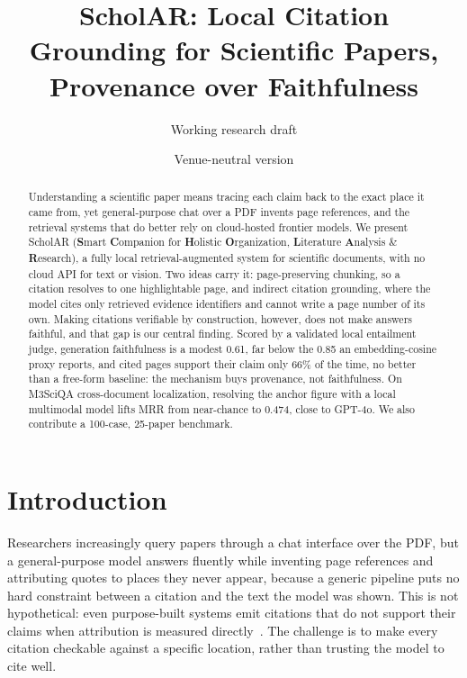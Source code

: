 \documentclass[11pt,letterpaper]{article}
\title{ScholAR: Local Citation Grounding for Scientific Papers,\\Provenance over Faithfulness}
\author{Working research draft}
\date{Venue-neutral version}
\begin{document}
\maketitle

\begin{abstract}
Understanding a scientific paper means tracing each claim back to the exact place it came from, yet
general-purpose chat over a PDF invents page references, and the retrieval systems that do better
rely on cloud-hosted frontier models. We present ScholAR (\textbf{S}mart \textbf{C}ompanion for
\textbf{H}olistic \textbf{O}rganization, \textbf{L}iterature \textbf{A}nalysis \& \textbf{R}esearch),
a fully local retrieval-augmented system for scientific documents, with no cloud API for text or
vision. Two ideas carry it: page-preserving chunking, so a citation resolves to one highlightable
page, and indirect citation grounding, where the model cites only retrieved evidence identifiers and
cannot write a page number of its own. Making citations verifiable by construction, however, does not
make answers faithful, and that gap is our central finding. Scored by a validated local entailment
judge, generation faithfulness is a modest 0.61, far below the 0.85 an embedding-cosine proxy
reports, and cited pages support their claim only 66\% of the time, no better than a free-form
baseline: the mechanism buys provenance, not faithfulness. On M3SciQA cross-document localization,
resolving the anchor figure with a local multimodal model lifts MRR from near-chance to 0.474, close
to GPT-4o. We also contribute a 100-case, 25-paper benchmark.
\end{abstract}

\section{Introduction}
Researchers increasingly query papers through a chat interface over the PDF, but a general-purpose
model answers fluently while inventing page references and attributing quotes to places they never
appear, because a generic pipeline puts no hard constraint between a citation and the text the model
was shown. This is not hypothetical: even purpose-built systems emit citations that do not support
their claims when attribution is measured directly~\citep{gao2023attributing}. The challenge is to
make every citation checkable against a specific location, rather than trusting the model to cite
well.
\end{document}
